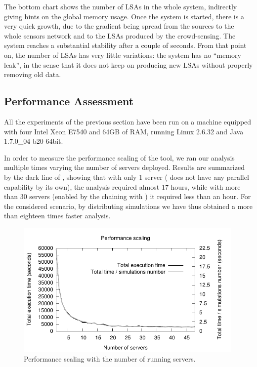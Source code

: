 \documentclass[12pt,a4paper,twoside,openright]{book}
\begin{document}
The bottom chart shows the number of LSAs in the whole system, indirectly giving hints on the global memory usage.
%
Once the system is started, there is a very quick growth, due to the gradient being spread from the sources to the whole sensors network and to the LSAs produced by the crowd-sensing.
%
The system reaches a substantial stability after a couple of seconds.
%
From that point on, the number of LSAs has very little variations: the system has no ``memory leak'', in the sense that it does not keep on producing new LSAs without properly removing old data. 

\subsection{Performance Assessment}
All the experiments of the previous section have been run on a machine equipped with four Intel\textregistered{} Xeon\textregistered{} E7540 and 64GB of RAM, running Linux 2.6.32 and Java 1.7.0\_04-b20 64bit.

In order to measure the performance scaling of the tool, we ran our analysis multiple times varying the number of \multivesta{} servers deployed.
%
Results are summarized by the dark line of , showing that with only 1 server (\alchemist{} does not have any parallel capability by its own), the analysis required almost 17 hours, while with more than 30 servers (enabled by the chaining with \multivesta{}) it required less than an hour. For the considered scenario, by distributing simulations we have thus obtained a more than eighteen times faster analysis.

\begin{figure}[t]
\begin{center}
\vspace{-0.2cm}
 \includegraphics[width=0.99\textwidth]{img/scaling}
 \end{center}
 \caption{Performance scaling with the number of running servers.}
 \label{img:performance}
\end{figure}
\end{document}
